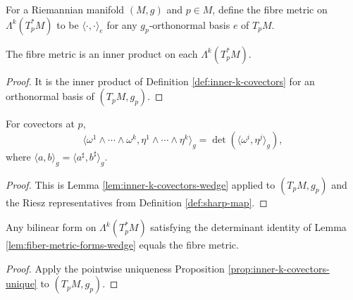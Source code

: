 \begin{definition}
\label{def:fiber-metric-forms-pointwise}
\leanok
{}
For a Riemannian manifold $(M,g)$ and $p\in M$, define the fibre metric on $\Lambda^k(T_p^*M)$ to be $\langle\cdot,\cdot\rangle_e$ for any $g_p$-orthonormal basis $e$ of $T_pM$.
\end{definition}

\begin{lemma}
\label{lem:fiber-metric-forms-inner-product}
\leanok
{}
The fibre metric is an inner product on each $\Lambda^k(T_p^*M)$.
\end{lemma}
\begin{proof}
\leanok
{}
\sketch It is the inner product of Definition \ref{def:inner-k-covectors} for an orthonormal basis of $(T_pM,g_p)$.
\end{proof}

\begin{lemma}
\label{lem:fiber-metric-forms-wedge}
\leanok
{}
For covectors at $p$,
\[
\langle\omega^1\wedge\cdots\wedge\omega^k,\eta^1\wedge\cdots\wedge\eta^k\rangle_g=\det(\langle\omega^i,\eta^j\rangle_g),
\]
where $\langle a,b\rangle_g=\langle a^\sharp,b^\sharp\rangle_g$.
\end{lemma}
\begin{proof}
\leanok
{}
\sketch This is Lemma \ref{lem:inner-k-covectors-wedge} applied to $(T_pM,g_p)$ and the Riesz representatives from Definition \ref{def:sharp-map}.
\end{proof}

\begin{lemma}
\label{lem:fiber-metric-forms-unique-pointwise}
\leanok
{}
Any bilinear form on $\Lambda^k(T_p^*M)$ satisfying the determinant identity of Lemma \ref{lem:fiber-metric-forms-wedge} equals the fibre metric.
\end{lemma}
\begin{proof}
\leanok
{}
\sketch Apply the pointwise uniqueness Proposition \ref{prop:inner-k-covectors-unique} to $(T_pM,g_p)$.
\end{proof}

